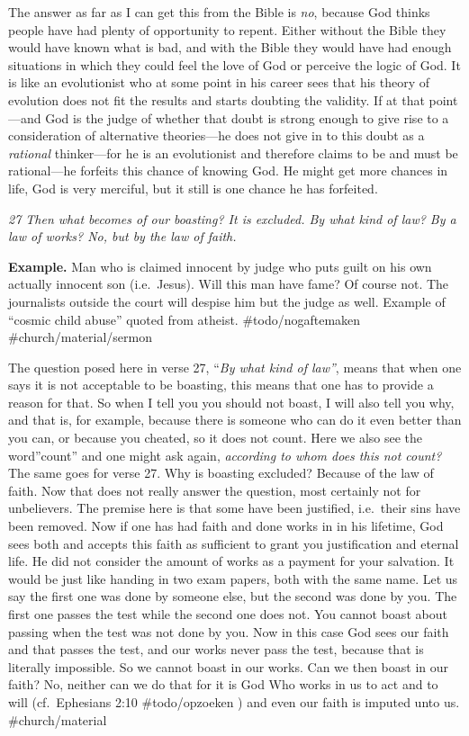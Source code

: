 The answer as far as I can get this from the Bible is \emph{no}, because
God thinks people have had plenty of opportunity to repent. Either
without the Bible they would have known what is bad, and with the Bible
they would have had enough situations in which they could feel the love
of God or perceive the logic of God. It is like an evolutionist who at
some point in his career sees that his theory of evolution does not fit
the results and starts doubting the validity. If at that point---and God
is the judge of whether that doubt is strong enough to give rise to a
consideration of alternative theories---he does not give in to this
doubt as a \emph{rational} thinker---for he is an evolutionist and
therefore claims to be and must be rational---he forfeits this chance of
knowing God. He might get more chances in life, God is very merciful,
but it still is one chance he has forfeited.

\emph{27 Then what becomes of our boasting? It is excluded. By what kind
of law? By a law of works? No, but by the law of faith.}

\textbf{Example.} Man who is claimed innocent by judge who puts guilt on
his own actually innocent son (i.e.~Jesus). Will this man have fame? Of
course not. The journalists outside the court will despise him but the
judge as well. Example of ``cosmic child abuse'' quoted from atheist.
\#todo/nogaftemaken \#church/material/sermon

The question posed here in verse 27, ``\emph{By what kind of law''},
means that when one says it is not acceptable to be boasting, this means
that one has to provide a reason for that. So when I tell you you should
not boast, I will also tell you why, and that is, for example, because
there is someone who can do it even better than you can, or because you
cheated, so it does not count. Here we also see the word''count'' and
one might ask again, \emph{according to whom does this not count?} The
same goes for verse 27. Why is boasting excluded? Because of the law of
faith. Now that does not really answer the question, most certainly not
for unbelievers. The premise here is that some have been justified,
i.e.~their sins have been removed. Now if one has had faith and done
works in in his lifetime, God sees both and accepts this faith as
sufficient to grant you justification and eternal life. He did not
consider the amount of works as a payment for your salvation. It would
be just like handing in two exam papers, both with the same name. Let us
say the first one was done by someone else, but the second was done by
you. The first one passes the test while the second one does not. You
cannot boast about passing when the test was not done by you. Now in
this case God sees our faith and that passes the test, and our works
never pass the test, because that is literally impossible. So we cannot
boast in our works. Can we then boast in our faith? No, neither can we
do that for it is God Who works in us to act and to will (cf.~Ephesians
2:10 \#todo/opzoeken ) and even our faith is imputed unto us.
\#church/material

